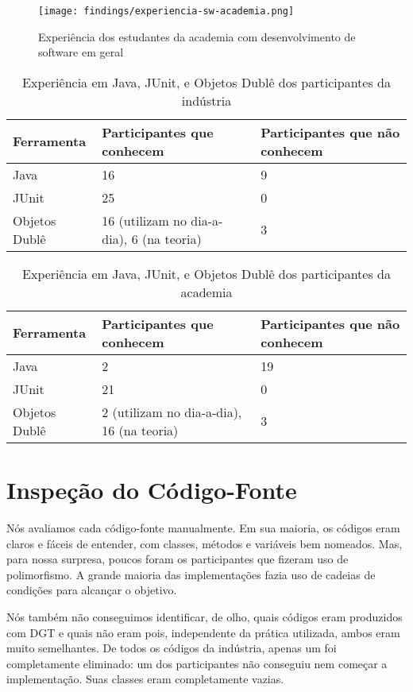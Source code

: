 \begin{figure}[h!]
  \centering
  \texttt{[image: findings/experiencia-sw-academia.png]}
  \caption{Experiência dos estudantes da academia com desenvolvimento de software em geral}
  \label{fig:exp-sw-academia}
\end{figure}


\begin{table}
	\begin{tabular}{ | p{5cm} | p{5cm} | p{5cm} | }
		\hline
		Ferramenta & Participantes que conhecem & Participantes que não conhecem\\
		\hline
		Java & 16 & 9\\
		JUnit & 25 & 0\\
		Objetos Dublê & 16 (utilizam no dia-a-dia), 6 (na teoria) & 3\\
		\hline
	\end{tabular}
	\caption{Experiência em Java, JUnit, e Objetos Dublê dos participantes da indústria}
	\label{tab:exp-industria}
\end{table}

\begin{table}
	\begin{tabular}{ | p{5cm} | p{5cm} | p{5cm} | }
		\hline
		Ferramenta & Participantes que conhecem & Participantes que não conhecem\\
		\hline
		Java & 2 & 19\\
		JUnit & 21 & 0\\
		Objetos Dublê & 2 (utilizam no dia-a-dia), 16 (na teoria) & 3\\
		\hline
	\end{tabular}
	\caption{Experiência em Java, JUnit, e Objetos Dublê dos participantes da academia}
	\label{tab:exp-academia}
\end{table}

\section{Inspeção do Código-Fonte}

Nós avaliamos cada código-fonte manualmente.
Em sua maioria, os códigos eram claros e fáceis de entender,
com classes, métodos e variáveis bem nomeados.
Mas, para nossa surpresa,
poucos foram os participantes que fizeram uso de polimorfismo. A grande
maioria das implementações fazia uso de cadeias de condições para 
alcançar o objetivo.

Nós também não conseguimos identificar, de olho, quais códigos
eram produzidos com DGT e quais não eram pois, independente
da prática utilizada, ambos eram muito semelhantes.
De todos os códigos da indústria, apenas um foi completamente eliminado:
um dos participantes não conseguiu nem começar a implementação. Suas classes
eram completamente vazias. 

